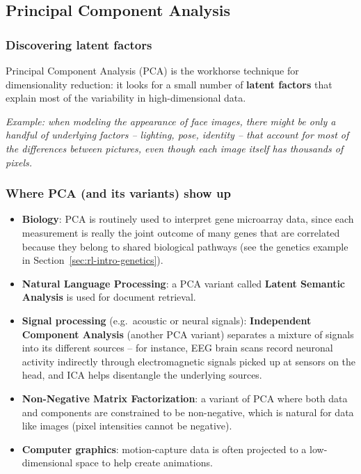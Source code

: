 \subsection{Principal Component Analysis}\label{sec:rl-intro-pca}

\subsubsection{Discovering latent factors}

Principal Component Analysis (PCA) is the workhorse technique for dimensionality reduction: it looks for a small number of \textbf{latent factors} that explain most of the variability in high-dimensional data.

\textit{Example: when modeling the appearance of face images, there might be only a handful of underlying factors -- lighting, pose, identity -- that account for most of the differences between pictures, even though each image itself has thousands of pixels.}

\subsubsection{Where PCA (and its variants) show up}

\begin{itemize}
  \item \textbf{Biology}: PCA is routinely used to interpret gene microarray data, since each measurement is really the joint outcome of many genes that are correlated because they belong to shared biological pathways (see the genetics example in Section~\ref{sec:rl-intro-genetics}).
  \item \textbf{Natural Language Processing}: a PCA variant called \textbf{Latent Semantic Analysis} is used for document retrieval.
  \item \textbf{Signal processing} (e.g.\ acoustic or neural signals): \textbf{Independent Component Analysis} (another PCA variant) separates a mixture of signals into its different sources -- for instance, EEG brain scans record neuronal activity indirectly through electromagnetic signals picked up at sensors on the head, and ICA helps disentangle the underlying sources.
  \item \textbf{Non-Negative Matrix Factorization}: a variant of PCA where both data and components are constrained to be non-negative, which is natural for data like images (pixel intensities cannot be negative).
  \item \textbf{Computer graphics}: motion-capture data is often projected to a low-dimensional space to help create animations.
\end{itemize}


